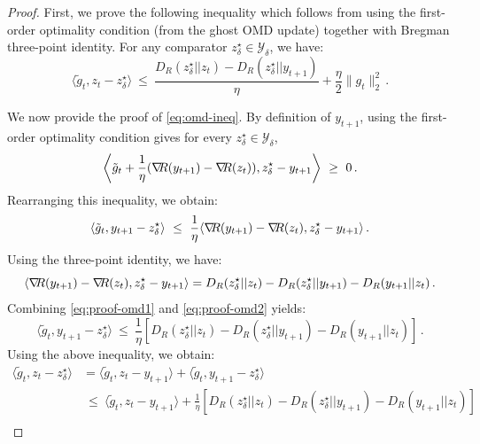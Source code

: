 \documentclass[a4paper,11pt,fullpage]{article}
\def\Y{{\mathcal Y}}
\theoremstyle{plain}
\theoremstyle{definition}
\theoremstyle{plain}
\renewcommand{\leq}{~\le~}
\renewcommand{\geq}{~\ge~}
\let\nablaold\nabla
\renewcommand{\nabla}{\nablaold\mkern-2.5mu}
\begin{document}
\begin{proof}
First, we prove the following inequality which follows from using the first-order optimality condition (from the ghost OMD update) together with Bregman three-point identity. For any comparator $z_{\delta}^{\star} \in \Y_{\delta}$, we have: 
\begin{equation}
\label{eq:omd-ineq}
\langle \tilde{g}_t, z_t - z_{\delta}^{\star}\rangle  
\leq \frac{D_R(z_{\delta}^{\star}||z_t) - D_R(z_{\delta}^{\star}||y_{t+1})}{\eta} + \frac{\eta}{2}\|g_t\|_2^2\,.
\end{equation}

We now provide the proof of \eqref{eq:omd-ineq}. By definition of $y_{t+1}$, using the first-order optimality condition gives for every $z_{\delta}^{\star} \in \Y_{\delta}$, 
\begin{equation*}
\left\langle \tilde{g}_t + \frac{1}{\eta} (\nabla R(y_{t+1}) - \nabla R(z_t)), z_{\delta}^{\star} - y_{t+1} \right\rangle \geq 0\,.
\end{equation*}
Rearranging this inequality, we obtain: 
\begin{equation}
\label{eq:proof-omd1}
\langle \tilde{g}_t, y_{t+1} - z_{\delta}^{\star} \rangle 
\leq \frac{1}{\eta} \langle \nabla R(y_{t+1}) - \nabla R(z_t), z_{\delta}^{\star} - y_{t+1} \rangle\,.
\end{equation}
Using the three-point identity, we have: 
\begin{equation}
\label{eq:proof-omd2}
\langle \nabla R(y_{t+1}) - \nabla R(z_t), z_{\delta}^{\star} - y_{t+1} \rangle = D_R(z_{\delta}^{\star}||z_t) - D_R(z_{\delta}^{\star}||y_{t+1}) - D_R(y_{t+1}||z_t)\,.
\end{equation}
Combining \eqref{eq:proof-omd1} and \eqref{eq:proof-omd2} yields: 
\begin{equation*}
\langle \tilde{g}_t, y_{t+1} - z_{\delta}^{\star} \rangle 
\leq \frac{1}{\eta}\left[ D_R(z_{\delta}^{\star}||z_t) - D_R(z_{\delta}^{\star}||y_{t+1}) - D_R(y_{t+1}||z_t) \right]\,.
\end{equation*}
Using the above inequality, we obtain: 
\begin{align*}
\langle \tilde{g}_t, z_t - z_{\delta}^{\star} \rangle 
&= \langle \tilde{g}_t, z_t - y_{t+1} \rangle 
+ \langle \tilde{g}_t, y_{t+1} - z_{\delta}^{\star} \rangle \nonumber\\ 
&\leq \langle \tilde{g}_t, z_t - y_{t+1} \rangle 
+ \frac{1}{\eta}\left[ D_R(z_{\delta}^{\star}||z_t) - D_R(z_{\delta}^{\star}||y_{t+1}) - D_R(y_{t+1}||z_t) \right] \nonumber\\

\end{align*}
\end{proof}
\end{document}
